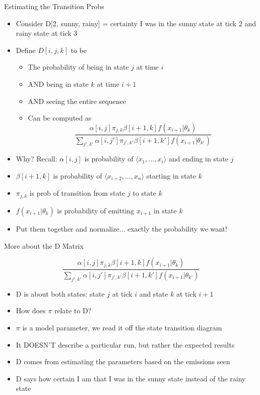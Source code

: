 \documentclass[aspectratio=169]{beamer}
\begin{document}
\begin{frame}{Estimating the Transition Probs}

\begin{itemize}
\item Consider D[2, sunny, rainy] = certainty I was in the sunny state at tick 2 and rainy state at tick 3
\item Define $D[i,j,k]$ to be
	\begin{itemize}
	\item The probability of being in state $j$ at time $i$
	\item AND being in state $k$ at time $i+1$
	\item AND seeing the entire sequence
	\item Can be computed as
	$$\frac{\alpha[i,j] \pi_{j,k} \beta[i+1,k] f(x_{i+1} | \theta_k)}
	{\sum_{j',k'} \alpha[i,j'] \pi_{j',k'} \beta[i+1,k'] f(x_{i+1} | \theta_{k'})}$$
	\end{itemize}
	\item Why? Recall: $\alpha[i,j]$ is probability of $\langle x_1, ..., x_i \rangle$ and ending in state $j$
	\item $\beta[i+1,k]$ is probability of $\langle x_{i + 2}, ..., x_n \rangle$ starting in state $k$
	\item $\pi_{j,k}$ is prob of transition from state $j$ to state $k$
	\item $f(x_{i+1} | \theta_k)$ is probability of emitting $x_{i+1}$ in state $k$
	\item Put them together and normalize... exactly the probability we want!
\end{itemize}
\end{frame}


\begin{frame}{More about the D Matrix}

	$$\frac{\alpha[i,j] \pi_{j,k} \beta[i+1,k] f(x_{i+1} | \theta_k)}
	{\sum_{j',k'} \alpha[i,j'] \pi_{j',k'} \beta[i+1,k'] f(x_{i+1} | \theta_{k'})}$$
\begin{itemize}
\item D is about both states: state $j$ at tick $i$ and state $k$ at tick $i+1$
\item How does $\pi$ relate to D?
\item $\pi$ is a model parameter, we read it off the state transition diagram
\item It DOESN'T describe a particular run, but rather the expected results
\item D comes from estimating the parameters based on the emissions seen
\item D says how certain I am that I was in the sunny state instead of the rainy state
\end{itemize}
\end{frame}
\end{document}
